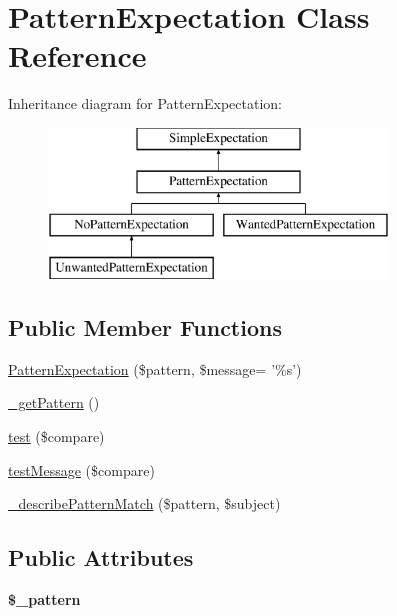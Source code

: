 \hypertarget{class_pattern_expectation}{
\section{PatternExpectation Class Reference}
\label{class_pattern_expectation}
}
Inheritance diagram for PatternExpectation:\begin{figure}[H]
\begin{center}
\leavevmode
\includegraphics[height=4.000000cm]{class_pattern_expectation}
\end{center}
\end{figure}
\subsection*{Public Member Functions}
\begin{DoxyCompactItemize}
\item 
\hyperlink{class_pattern_expectation_a870ee69338895ba6f682be2f9889427a}{PatternExpectation} (\$pattern, \$message= '\%s')
\item 
\hyperlink{class_pattern_expectation_a6f9695a6350b86f418a42e0252f0e59e}{\_\-getPattern} ()
\item 
\hyperlink{class_pattern_expectation_a672fecfc691c4c115d4f4d37c365dae5}{test} (\$compare)
\item 
\hyperlink{class_pattern_expectation_a7adc09e88f1abac0401d807e7f4763c8}{testMessage} (\$compare)
\item 
\hyperlink{class_pattern_expectation_a9a6c6de1a8d1fccb816177426d5f5bda}{\_\-describePatternMatch} (\$pattern, \$subject)
\end{DoxyCompactItemize}
\subsection*{Public Attributes}
\begin{DoxyCompactItemize}
\item 
\hypertarget{class_pattern_expectation_a3c439fdabfebdd16b787f164724446e5}{
{\bfseries \$\_\-pattern}}
\label{class_pattern_expectation_a3c439fdabfebdd16b787f164724446e5}

\end{DoxyCompactItemize}


